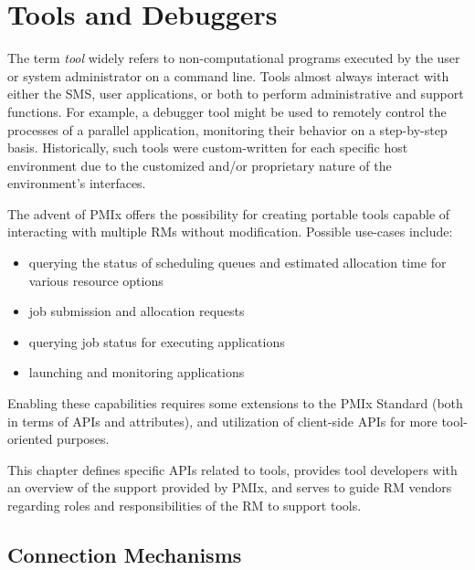 \chapter{Tools and Debuggers}
\label{chap:api_tools}

The term \textit{tool} widely refers to non-computational programs executed by the user or system administrator on a command line. Tools almost always interact with either the \ac{SMS}, user applications, or both to perform administrative and support functions. For example, a debugger tool might be used to remotely control the processes of a parallel application, monitoring their behavior on a step-by-step basis. Historically, such tools were custom-written for each specific host environment due to the customized and/or proprietary nature of the environment's interfaces.

The advent of \ac{PMIx} offers the possibility for creating portable tools capable of interacting with multiple \acp{RM} without modification. Possible use-cases include:

\begin{itemize}
\item querying the status of scheduling queues and estimated allocation time for various resource options
\item job submission and allocation requests
\item querying job status for executing applications
\item launching and monitoring applications
\end{itemize}

Enabling these capabilities requires some extensions to the \ac{PMIx} Standard (both in terms of \acp{API} and attributes), and utilization of client-side \acp{API} for more tool-oriented purposes.

This chapter defines specific \acp{API} related to tools, provides tool developers with an overview of the support provided by \ac{PMIx}, and serves to guide \ac{RM} vendors regarding roles and responsibilities of the \ac{RM} to support tools.

\section{Connection Mechanisms}
\label{chap:api_tools:cnct}

